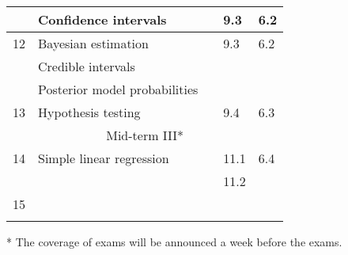 \documentclass[10pt]{article}
\begin{document}
\begin{center}
\begin{tabular}{|l|l|l|l|l|}
& Confidence intervals &  & 9.3 & 6.2\\
\hline
12 & Bayesian estimation &  & 9.3 & 6.2\\
& Credible intervals & & & \\
& Posterior model probabilities & & & \\
\hline
13 & Hypothesis testing &  & 9.4 & 6.3 \\
\hline
\hline
\multicolumn{5}{|c|}{Mid-term III*} \\
\hline
\hline
14 & Simple linear regression &  & 11.1 & 6.4 \\
& &  & 11.2 & \\
\hline
15 & &&& \\
& & & & \\
\hline
\end{tabular}
\end{center}

* The coverage of exams will be announced a week before the exams.
\end{document}
